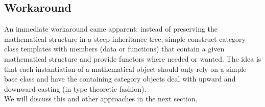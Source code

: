 \subsection{Workaround}
An immediate workaround came apparent: instead of preserving the mathematical structure in a steep inheritance tree, simple construct category class templates with members (data or functions) that contain a given mathematical structure and provide functors where needed or wanted. The idea is that each instantiation of a mathematical object should only rely on a simple base class and have the containing category objects deal with upward and downward casting (in type theoretic fashion).\\
\indent We will discuss this and other approaches in the next section.\\